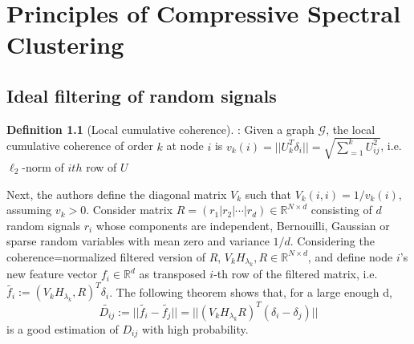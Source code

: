 \documentclass[10pt,a4paper,twoside]{report}
\theoremstyle{definition}
\newtheorem{definition}{Definition}[section]
\newcommand{\norm}[1]{\lvert\lvert {#1} \rvert\rvert}
\begin{document}
	\chapter{Principles of Compressive Spectral Clustering}
	\section{Ideal filtering of random signals}

	\begin{definition}[Local cumulative coherence]: 
		Given a graph $\mathcal{G}$, the local cumulative coherence of order $k$ at node $i$ is $v_k(i) = \lvert \lvert U_k^T\delta_i\rvert \rvert = \sqrt{\sum_{=1}^k U_{ij}^2}$, i.e. $\ell_2$-norm of $i{th}$ row of $U$
	\end{definition}

	Next, the authors define the diagonal matrix $V_k$ such that $V_k(i,i) = 1/v_k(i)$, assuming $v_k > 0$. Consider matrix $R = (r_1|r_2|\cdots|r_d) \in \mathbb{R}^{N\times d}$ consisting of $d$ random signals $r_i$ whose components are independent, Bernouilli, Gaussian or sparse random variables with mean zero and variance $1/d$. Considering the coherence=normalized filtered version of $R$, $V_kH_{\lambda_k}, R \in \mathbb{R}^{N\times d}$, and define node $i$'s new feature vector $f_i \in \mathbb{R}^d$ as transposed $i$-th row of the filtered matrix, i.e. $\tilde{f_i} := (V_kH_{\lambda_k}, R)^T\delta_i$. The following theorem shows that, for a large enough d, $$\tilde{D_{ij}} := \norm{\tilde{f_i} - \tilde{f_j}} = \norm{(V_kH_{\lambda_k}R)^T(\delta_i-\delta_j)}$$ is a good estimation of $D_{ij}$ with high probability.
\end{document}
